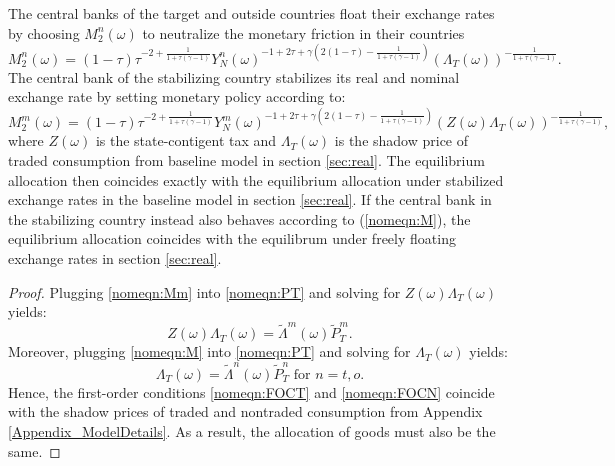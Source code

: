 \begin{prop}
  The central banks of the target and outside countries float their
  exchange rates by choosing $M^n_2(\omega) $ to neutralize the
  monetary friction in their countries
  \begin{equation}
    M^n_2(\omega) = (1 - \tau) \tau^{-2 + \frac{1}{1 + \tau (\gamma - 1)}}
    Y^n_N(\omega)^{-1 + 2 \tau + \gamma \left( 2 (1 - \tau) - \frac{1}{1 + \tau (\gamma - 1)} \right)}
    \left(\Lambda_T(\omega) \right)^{- \frac{1}{1 + \tau(\gamma - 1)}}.
    \label{nomeqn:M}
  \end{equation}
  The central bank of the stabilizing country stabilizes its real and
  nominal exchange rate by setting monetary policy according to:
  \begin{equation}
    M^m_2(\omega) = (1 - \tau) \tau^{-2 + \frac{1}{1 + \tau (\gamma - 1)}}
    Y^m_N(\omega)^{-1 + 2 \tau + \gamma \left( 2 (1 - \tau) - \frac{1}{1 + \tau (\gamma - 1)} \right)}
    \left( Z(\omega)\Lambda_T(\omega) \right)^{- \frac{1}{1 + \tau(\gamma - 1)}},
    \label{nomeqn:Mm}
  \end{equation}
  where $Z(\omega)$ is the state-contigent tax and $\Lambda_T(\omega)$
  is the shadow price of traded consumption from baseline model in
  section \ref{sec:real}. The equilibrium allocation then coincides
  exactly with the equilibrium allocation under stabilized exchange
  rates in the baseline model in section \ref{sec:real}. If the
  central bank in the stabilizing country instead also behaves
  according to (\ref{nomeqn:M}), the equilibrium allocation coincides
  with the equilibrum under freely floating exchange rates in section
  \ref{sec:real}.\end{prop}

\begin{proof}
  Plugging \eqref{nomeqn:Mm} into \eqref{nomeqn:PT} and solving for
  $Z(\omega) \Lambda_T(\omega)$ yields:
  \begin{equation*}
    Z(\omega) \Lambda_T(\omega) = \tilde{\Lambda}^m(\omega) \tilde{P}^m_T.
  \end{equation*}
  Moreover, plugging \eqref{nomeqn:M} into \eqref{nomeqn:PT} and
  solving for $\Lambda_T(\omega)$ yields:
  \begin{equation*}
    \Lambda_T(\omega) = \tilde{\Lambda}^n(\omega) \tilde{P}^n_T \text{ for } n = t, o.
  \end{equation*}
  Hence, the first-order conditions \eqref{nomeqn:FOCT} and
  \eqref{nomeqn:FOCN} coincide with the shadow prices of traded and
  nontraded consumption from Appendix \ref{Appendix_ModelDetails}. As
  a result, the allocation of goods must also be the same.
\end{proof}

